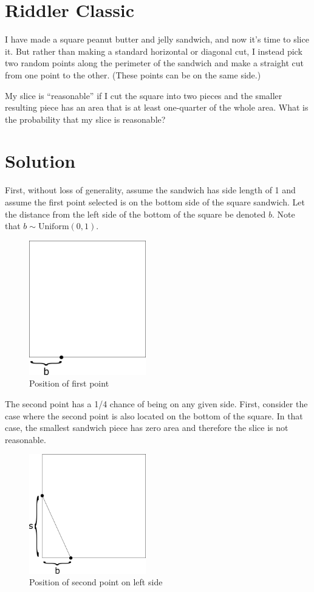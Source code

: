 \documentclass[12pt]{article}
\begin{document}
	
\section*{Riddler Classic}

I have made a square peanut butter and jelly sandwich, and now it’s time to slice it. But rather than making a standard horizontal or diagonal cut, I instead pick two random points along the perimeter of the sandwich and make a straight cut from one point to the other. (These points can be on the same side.)

My slice is ``reasonable'' if I cut the square into two pieces and the smaller resulting piece has an area that is at least one-quarter of the whole area. What is the probability that my slice is reasonable?

\section*{Solution}
First, without loss of generality, assume the sandwich has side length of 1 and assume the first point selected is on the bottom side of the square sandwich. Let the distance from the left side of the bottom of the square be denoted $b$. Note that $b\sim \mbox{Uniform}(0, 1)$.

\begin{figure}[!h]
	\centering
	\includegraphics[width=2in]{1.png}
	\caption{Position of first point}
\end{figure}

The second point has a 1/4 chance of being on any given side. First, consider the case where the second point is also located on the bottom of the square. In that case, the smallest sandwich piece has zero area and therefore the slice is not reasonable.

\begin{figure}[!h]
	\centering
	\includegraphics[width=2in]{2.png}
	\caption{Position of second point on left side}
\end{figure}
\end{document}
